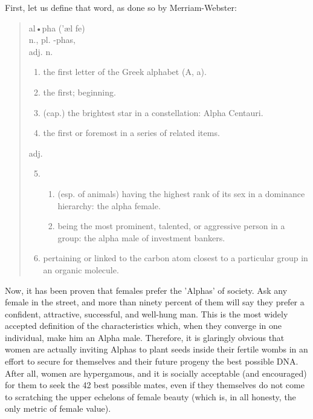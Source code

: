 First, let us define that word, as done so by Merriam-Webster:
\begin{quote}
 al•pha ('æl fe)
\\
 n., pl. -phas,\\
 adj. n.
\begin{enumerate}
       \item the first letter of the Greek alphabet (A, a).
       \item the first; beginning.
       \item (cap.) the brightest star in a constellation: Alpha Centauri.
       \item the first or foremost in a series of related items. 
\end{enumerate}
 adj.
\begin{enumerate}
\setcounter{enumi}{4}
       \item \begin{enumerate}
          \item  (esp. of animals) having the highest rank of its sex in a dominance hierarchy: the alpha female.
          \item  being the most prominent, talented, or aggressive person in a group: the alpha male of investment bankers.
       \end{enumerate}
       \item pertaining or linked to the carbon atom closest to a particular group in an organic molecule. 
\end{enumerate}
\end{quote}

Now, it has been proven that females prefer the 'Alphas' of society. Ask any female in
the street, and more than ninety percent of them will say they prefer a confident, attractive,
successful, and well-hung man. This is the most widely accepted definition of the characteristics
which, when they converge in one individual, make him an Alpha male. Therefore, it is glaringly
obvious that women are actually inviting Alphas to plant seeds inside their fertile wombs in
an effort to secure for themselves and their future progeny the best possible DNA. After all,
women are hypergamous, and it is socially acceptable (and encouraged) for them to seek the
42 best possible mates, even if they themselves do not come to scratching the upper echelons of female beauty (which is, in all honesty, the only metric of female value).



